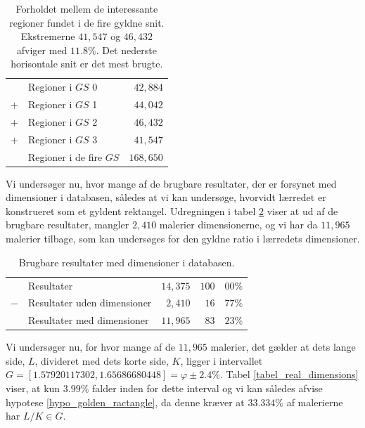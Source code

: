 {\begin{table}[H]
    \centering
    \begin{tabular}{r@{\ \ }p{12em}r}
            & Regioner i $GS$ 0             &  $42,884$ \\
        $+$ & Regioner i $GS$ 1             &  $44,042$ \\
        $+$ & Regioner i $GS$ 2             &  $46,432$ \\
        $+$ & Regioner i $GS$ 3             &  $41,547$ \\\hline
            & Regioner i de fire $GS$       & $168,650$
    \end{tabular}
    \caption[]{Forholdet mellem de interessante regioner fundet i de
    fire gyldne snit. Ekstremerne $41,547$ og $46,432$ afviger med
    $11.8 \%$. Det nederste horisontale snit er det mest brugte.}
    \label{tabel_fire_snit}
\end{table}

Vi undersøger nu, hvor mange af de brugbare resultater, der er forsynet
med dimensioner i databasen, således at vi kan undersøge, hvorvidt
lærredet er konstrueret som et gyldent rektangel. Udregningen i tabel
\ref{tabel_med_dimensioner} viser at ud af de brugbare resultater,
mangler $2,410$ malerier dimensionerne, og vi har da $11,965$ malerier
tilbage, som kan undersøges for den gyldne ratio i lærredets
dimensioner.

\begin{table}[H]
    \centering
    \begin{tabular}{r@{\ \ }p{14em}r|r@{.}l}
            & Resultater                     & $14,375$ & $100$ & $00\%$ \\
        $-$ & Resultater uden dimensioner    &  $2,410$ &  $16$ & $77\%$ \\\hline
            & Resultater med dimensioner     & $11,965$ &  $83$ & $23\%$
    \end{tabular}
    \caption[]{Brugbare resultater med dimensioner i databasen.}
    \label{tabel_med_dimensioner}
\end{table}

Vi undersøger nu, for hvor mange af de $11,965$ malerier, det gælder at
dets lange side, $L$, divideret med dets korte side, $K$, ligger i
intervallet $G = [1.57920117302, 1.65686680448] = \varphi \pm 2.4\%$.
Tabel \ref{tabel_real_dimensions} viser, at kun $3.99\%$ falder inden
for dette interval og vi kan således afvise hypotese
\ref{hypo_golden_ractangle}, da denne kræver at $33.334 \%$ af
malerierne har $L/K \in G$.

}
